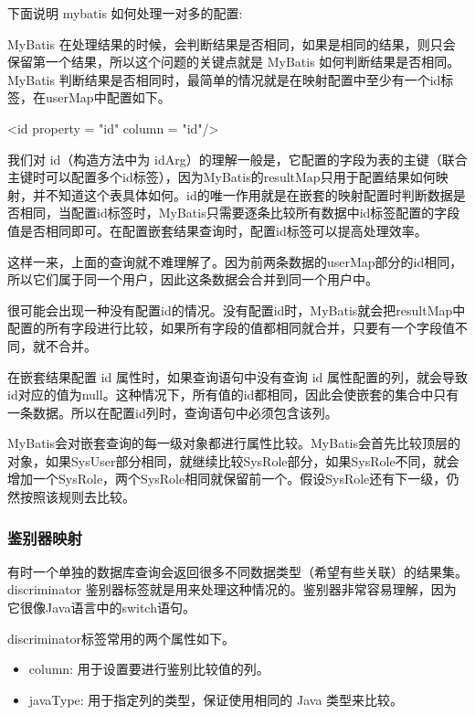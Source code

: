 下面说明 mybatis 如何处理一对多的配置:

MyBatis 在处理结果的时候，会判断结果是否相同，如果是相同的结果，则只会保留第一个结果，所以这个问题的关键点就是 MyBatis 如何判断结果是否相同。MyBatis 判断结果是否相同时，最简单的情况就是在映射配置中至少有一个id标签，在userMap中配置如下。

\begin{xml}
<id property = "id" column = "id"/>
\end{xml}

我们对 id（构造方法中为 idArg）的理解一般是，它配置的字段为表的主键（联合主键时可以配置多个id标签），因为MyBatis的resultMap只用于配置结果如何映射，并不知道这个表具体如何。id的唯一作用就是在嵌套的映射配置时判断数据是否相同，当配置id标签时，MyBatis只需要逐条比较所有数据中id标签配置的字段值是否相同即可。在配置嵌套结果查询时，配置id标签可以提高处理效率。

这样一来，上面的查询就不难理解了。因为前两条数据的userMap部分的id相同，所以它们属于同一个用户，因此这条数据会合并到同一个用户中。

很可能会出现一种没有配置id的情况。没有配置id时，MyBatis就会把resultMap中配置的所有字段进行比较，如果所有字段的值都相同就合并，只要有一个字段值不同，就不合并。

在嵌套结果配置 id 属性时，如果查询语句中没有查询 id 属性配置的列，就会导致 id对应的值为null。这种情况下，所有值的id都相同，因此会使嵌套的集合中只有一条数据。所以在配置id列时，查询语句中必须包含该列。

MyBatis会对嵌套查询的每一级对象都进行属性比较。MyBatis会首先比较顶层的对象，如果SysUser部分相同，就继续比较SysRole部分，如果SysRole不同，就会增加一个SysRole，两个SysRole相同就保留前一个。假设SysRole还有下一级，仍然按照该规则去比较。

\subsubsection{鉴别器映射}

有时一个单独的数据库查询会返回很多不同数据类型（希望有些关联）的结果集。discriminator 鉴别器标签就是用来处理这种情况的。鉴别器非常容易理解，因为它很像Java语言中的switch语句。

discriminator标签常用的两个属性如下。
\begin{itemize}
    \item column: 用于设置要进行鉴别比较值的列。
    \item javaType: 用于指定列的类型，保证使用相同的 Java 类型来比较。
\end{itemize}

